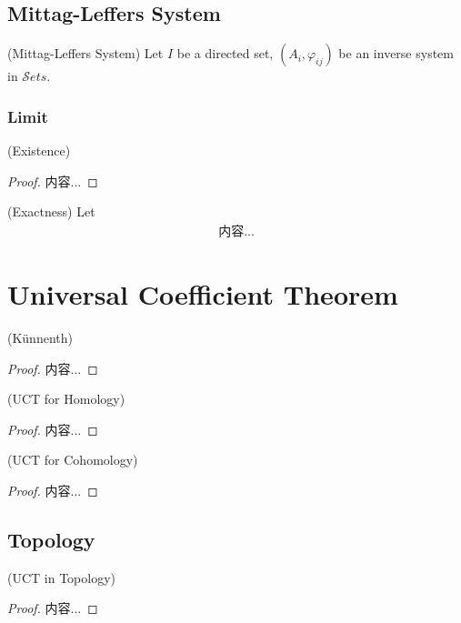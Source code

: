\documentclass[Total.tex]{subfiles}
\begin{document}
			\subsection{Mittag-Leffers System}
			\begin{Def}
				(Mittag-Leffers System) Let $I$ be a directed set, $(A_i,\varphi_{ij})$ be an inverse system in $\mathcal Sets$. 
			\end{Def}
			\subsubsection{Limit}
			\begin{lemma}
				(Existence)
			\end{lemma}
			\begin{proof}
				内容...
			\end{proof}
			\begin{lemma}
				(Exactness) Let 
				\begin{gather*}
					内容...
				\end{gather*}
			\end{lemma}
		\section{Universal Coefficient Theorem}
			\begin{theorem}
				(K\"{u}nnenth) 
			\end{theorem}
			\begin{proof}
				内容...
			\end{proof}
			
			\begin{theorem}
				(UCT for Homology)
			\end{theorem}
			\begin{proof}
				内容...
			\end{proof}
			
			\begin{theorem}
				(UCT for Cohomology)
			\end{theorem}
			\begin{proof}
				内容...
			\end{proof}
			
			\subsection{Topology}
			\begin{theorem}
				(UCT in Topology)
			\end{theorem}
			\begin{proof}
				内容...
			\end{proof}
\end{document}
